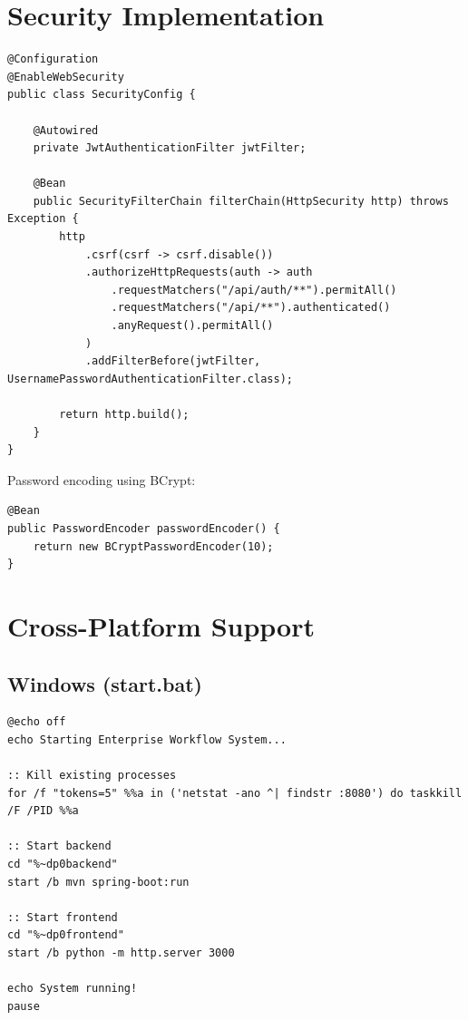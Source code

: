 \documentclass[12pt,a4paper,twoside]{book}
\begin{document}
\section{Security Implementation}

\begin{lstlisting}[style=java]
@Configuration
@EnableWebSecurity
public class SecurityConfig {
    
    @Autowired
    private JwtAuthenticationFilter jwtFilter;
    
    @Bean
    public SecurityFilterChain filterChain(HttpSecurity http) throws Exception {
        http
            .csrf(csrf -> csrf.disable())
            .authorizeHttpRequests(auth -> auth
                .requestMatchers("/api/auth/**").permitAll()
                .requestMatchers("/api/**").authenticated()
                .anyRequest().permitAll()
            )
            .addFilterBefore(jwtFilter, UsernamePasswordAuthenticationFilter.class);
        
        return http.build();
    }
}
\end{lstlisting}

Password encoding using BCrypt:

\begin{lstlisting}[style=java]
@Bean
public PasswordEncoder passwordEncoder() {
    return new BCryptPasswordEncoder(10);
}
\end{lstlisting}

\section{Cross-Platform Support}

\subsection{Windows (start.bat)}

\begin{lstlisting}[style=bash]
@echo off
echo Starting Enterprise Workflow System...

:: Kill existing processes
for /f "tokens=5" %%a in ('netstat -ano ^| findstr :8080') do taskkill /F /PID %%a

:: Start backend
cd "%~dp0backend"
start /b mvn spring-boot:run

:: Start frontend
cd "%~dp0frontend"
start /b python -m http.server 3000

echo System running!
pause
\end{lstlisting}
\end{document}
